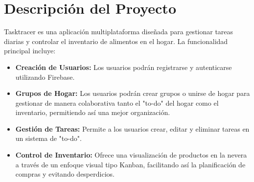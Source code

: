 \documentclass{article}
\begin{document}
\section{Descripción del Proyecto}
Tasktracer es una aplicación multiplataforma diseñada para gestionar tareas diarias y controlar el inventario de alimentos en el hogar. La funcionalidad principal incluye:
\begin{itemize}

    \item \textbf{Creación de Usuarios:} Los usuarios podrán registrarse y autenticarse utilizando Firebase.
    \item \textbf{Grupos de Hogar:} Los usuarios podrán crear grupos o unirse de hogar para gestionar de manera colaborativa tanto el "to-do" del hogar como el inventario, permitiendo así una mejor organización.
    
    \item \textbf{Gestión de Tareas:} Permite a los usuarios crear, editar y eliminar tareas en un sistema de "to-do".
    \item \textbf{Control de Inventario:} Ofrece una visualización de productos en la nevera a través de un enfoque visual tipo Kanban, facilitando así la planificación de compras y evitando desperdicios.

\end{itemize}

   

      
\end{document}
